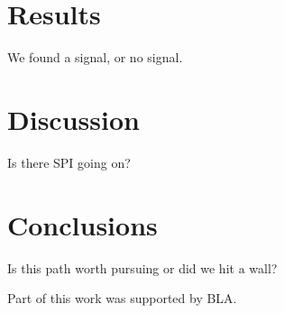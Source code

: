 \documentclass{aa}
\begin{document}
\section{Results}
We found a signal, or no signal.

\section{Discussion}
Is there SPI going on?

\section{Conclusions}
Is  this path worth pursuing or did we hit a wall?



\begin{acknowledgements}
      Part of this work was supported by BLA.
\end{acknowledgements}

\end{document}
